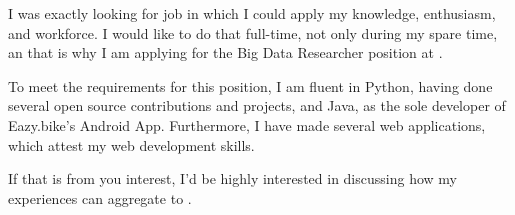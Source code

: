 
I was exactly looking for job in which I could apply my knowledge, enthusiasm, and workforce. I would like to do that full-time, not only during my spare time, an that is why I am applying for the Big Data Researcher position at \companyName. 



To meet the requirements for this position, I am fluent in Python, having done several open source contributions and projects, and Java, as the sole developer of Eazy.bike's Android App. Furthermore, I have made several web applications, which attest my web development skills.

If that is from you interest, I'd be highly interested in discussing how my experiences can aggregate to \companyName.

\makeletterclosing
